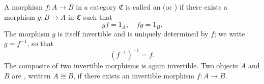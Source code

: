 A morphism $f: A \to B$ in a category $\mathfrak{C}$ is called an  (or ) if there exists a morphism $g: B \to A$ in $\mathfrak{C}$ such that
$$gf = 1_A, \quad fg = 1_B.$$
The morphism $g$ is itself invertible and is uniquely determined by $f$; we write $g = f^{-1}$, so that
$$(f^{-1})^{-1} = f.$$
The composite of two invertible morphisms is again invertible. Two objects $A$ and $B$ are , written $A \cong B$, if there exists an invertible morphism $f: A \to B$.
